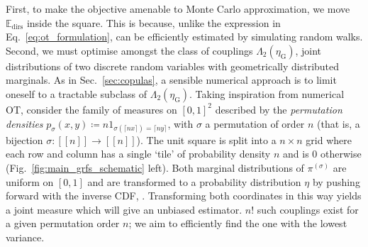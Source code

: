 First, to make the objective amenable to Monte Carlo approximation, we move $\mathbb{E}_\textrm{dirs}$ inside the square. 
This is because, unlike the expression in Eq.~\ref{eq:ot_formulation},  can be efficiently estimated by simulating random walks. 
Second, we must optimise amongst the class of couplings 
$\Lambda_2(\eta_\textrm{G})$, joint distributions of two discrete random variables with geometrically distributed marginals.
As in Sec.~\ref{sec:copulas}, a sensible numerical approach is to limit oneself to a tractable subclass of $\Lambda_2(\eta_\textrm{G})$. 
Taking inspiration from numerical OT, consider the family of measures \smash{$\pi^{(\sigma)}$} on $[0,1]^2$ described by the \emph{permutation densities} 
$p_\sigma(x,y) \coloneqq n 1_{\sigma(\lceil nx \rceil) = \lceil ny \rceil}$,
 with $\sigma$ a permutation of order $n$ (that is, a bijection $\sigma: [\![n]\!] \to [\![n]\!]$). 
The unit square is split into a $n\times  n$ grid where each row and column has a single `tile' of probability density $n$ and is $0$ otherwise (Fig.~\ref{fig:main_grfs_schematic} left).
Both marginal distributions of $\pi^{(\sigma)}$ are uniform on $[0,1]$ and are transformed to a probability distribution $\eta$ by pushing forward with the inverse CDF, . 
Transforming both coordinates in this way yields a joint measure  which will give an unbiased estimator. 
$n!$ such couplings exist for a given permutation order $n$; we aim to efficiently find the one with the lowest variance.

